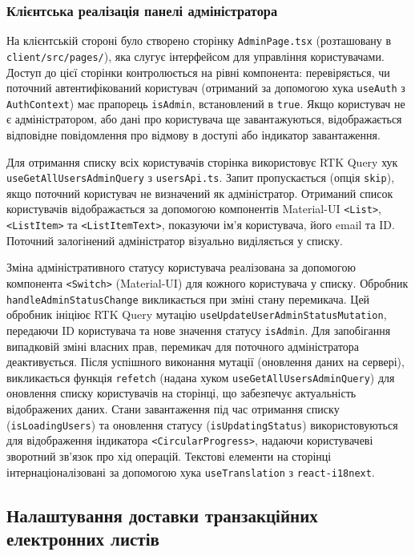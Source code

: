 \subsubsection{Клієнтська реалізація панелі адміністратора}
На клієнтській стороні було створено сторінку \texttt{AdminPage.tsx} (розташовану в \texttt{client/src/pages/}), яка слугує інтерфейсом для управління користувачами. Доступ до цієї сторінки контролюється на рівні компонента: перевіряється, чи поточний автентифікований користувач (отриманий за допомогою хука \texttt{useAuth} з \texttt{AuthContext}) має прапорець \texttt{isAdmin}, встановлений в \texttt{true}. Якщо користувач не є адміністратором, або дані про користувача ще завантажуються, відображається відповідне повідомлення про відмову в доступі або індикатор завантаження.

Для отримання списку всіх користувачів сторінка використовує RTK Query хук \texttt{useGetAllUsersAdminQuery} з \texttt{usersApi.ts}. Запит пропускається (опція \texttt{skip}), якщо поточний користувач не визначений як адміністратор. Отриманий список користувачів відображається за допомогою компонентів Material-UI \texttt{<List>}, \texttt{<ListItem>} та \texttt{<ListItemText>}, показуючи ім'я користувача, його email та ID. Поточний залогінений адміністратор візуально виділяється у списку.

Зміна адміністративного статусу користувача реалізована за допомогою компонента \texttt{<Switch>} (Material-UI) для кожного користувача у списку. Обробник \texttt{handleAdminStatusChange} викликається при зміні стану перемикача. Цей обробник ініціює RTK Query мутацію \texttt{useUpdateUserAdminStatusMutation}, передаючи ID користувача та нове значення статусу \texttt{isAdmin}. Для запобігання випадковій зміні власних прав, перемикач для поточного адміністратора деактивується. Після успішного виконання мутації (оновлення даних на сервері), викликається функція \texttt{refetch} (надана хуком \texttt{useGetAllUsersAdminQuery}) для оновлення списку користувачів на сторінці, що забезпечує актуальність відображених даних. Стани завантаження під час отримання списку (\texttt{isLoadingUsers}) та оновлення статусу (\texttt{isUpdatingStatus}) використовуються для відображення індикатора \texttt{<CircularProgress>}, надаючи користувачеві зворотний зв'язок про хід операцій. Текстові елементи на сторінці інтернаціоналізовані за допомогою хука \texttt{useTranslation} з \texttt{react-i18next}.

\subsection{Налаштування доставки транзакційних електронних листів}
\label{subsec:email_delivery}

